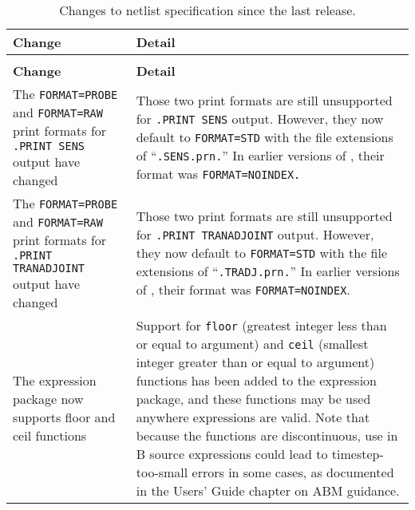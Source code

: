 



{
\small

\begin{longtable}[h] {>{\raggedright\small}m{2in}|>{\raggedright\let\\\tabularnewline\small}m{3.5in}}
  \caption{Changes to netlist specification since the last release.\label{newUsage}} \\ \hline
  \rowcolor{XyceDarkBlue}
  \color{white}\bf Change &
  \color{white}\bf Detail \\ \hline \endfirsthead
  \caption[]{Changes to netlist specification since the last release.\label{newUsage}} \\ \hline
  \rowcolor{XyceDarkBlue}
  \color{white}\bf Change &
  \color{white}\bf Detail \\ \hline \endhead

The \texttt{FORMAT=PROBE} and \texttt{FORMAT=RAW} print formats for 
\texttt{.PRINT SENS} output have changed & Those two print formats are 
still unsupported for \texttt{.PRINT SENS} output. However, they now 
default to \texttt{FORMAT=STD} with the file extensions of
``\texttt{.SENS.prn.}'' In earlier versions of \Xyce{}, their format was
\texttt{FORMAT=NOINDEX.} 
\\ \hline

The \texttt{FORMAT=PROBE} and \texttt{FORMAT=RAW} print formats for 
\texttt{.PRINT TRANADJOINT} output have changed & Those two print formats 
are still unsupported for \texttt{.PRINT TRANADJOINT} output. However,
they now default to \texttt{FORMAT=STD} with the file extensions of 
``\texttt{.TRADJ.prn.}'' In earlier versions of \Xyce{}, their format was 
\texttt{FORMAT=NOINDEX}. \\ \hline

The expression package now supports floor and ceil functions & Support
for \texttt{floor} (greatest integer less than or equal to argument)
and \texttt{ceil} (smallest integer greater than or equal to argument)
functions has been added to the expression package, and these
functions may be used anywhere expressions are valid.  Note that
because the functions are discontinuous, use in B source expressions
could lead to timestep-too-small errors in some cases, as documented
in the Users' Guide chapter on ABM guidance. \\ \hline


\end{longtable}}
